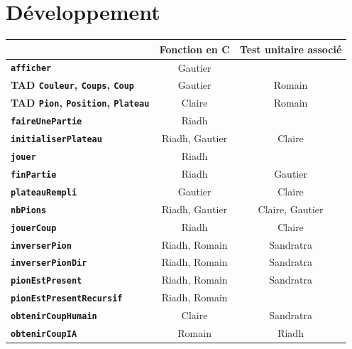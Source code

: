 \documentclass[11pt]{report}
\begin{document}
\chapter{Développement}
\begin{table}[h]
\begin{center}
\begin{tabular}{c|c|c|}
  \cline{2-3}
   & \textbf{Fonction en C} & \textbf{Test unitaire associé} \\ \hline
  \multicolumn{1}{|l|}{\textbf{\texttt{afficher}}} & Gautier & \cellcolor{lightgray} \\ \hline
  \multicolumn{1}{|l|}{\textbf{TAD \texttt{Couleur}, \texttt{Coups}, \texttt{Coup}}} & Gautier & Romain \\ \hline
  \multicolumn{1}{|l|}{\textbf{TAD \texttt{Pion}, \texttt{Position}, \texttt{Plateau}}} & Claire & Romain \\ \hline
  \multicolumn{1}{|l|}{\textbf{\texttt{faireUnePartie}}} & Riadh & \cellcolor{lightgray} \\ \hline
  \multicolumn{1}{|l|}{\textbf{\texttt{initialiserPlateau}}} & Riadh, Gautier & Claire \\ \hline
 \multicolumn{1}{|l|}{ \textbf{\texttt{jouer}}} & Riadh & \cellcolor{lightgray} \\ \hline
 \multicolumn{1}{|l|}{ \textbf{\texttt{finPartie}}} & Riadh & Gautier \\ \hline
  \multicolumn{1}{|l|}{\textbf{\texttt{plateauRempli}}} & Gautier & Claire \\ \hline
  \multicolumn{1}{|l|}{\textbf{\texttt{nbPions}}} & Riadh, Gautier & Claire, Gautier \\ \hline
  \multicolumn{1}{|l|}{\textbf{\texttt{jouerCoup}}} & Riadh & Claire \\ \hline
  \multicolumn{1}{|l|}{\textbf{\texttt{inverserPion}}} & Riadh, Romain & Sandratra \\ \hline
  \multicolumn{1}{|l|}{\textbf{\texttt{inverserPionDir}}} & Riadh, Romain & Sandratra\\ \hline
  \multicolumn{1}{|l|}{\textbf{\texttt{pionEstPresent}}} & Riadh, Romain & Sandratra \\ \hline
 \multicolumn{1}{|l|}{ \textbf{\texttt{pionEstPresentRecursif}}} & Riadh, Romain & \cellcolor{lightgray} \\ \hline
  \multicolumn{1}{|l|}{\textbf{\texttt{obtenirCoupHumain}}} & Claire & Sandratra\\ \hline
 \multicolumn{1}{|l|}{ \textbf{\texttt{obtenirCoupIA}}} & Romain & Riadh \\ \hline

\end{tabular}
\end{center}
\end{table}
\end{document}
